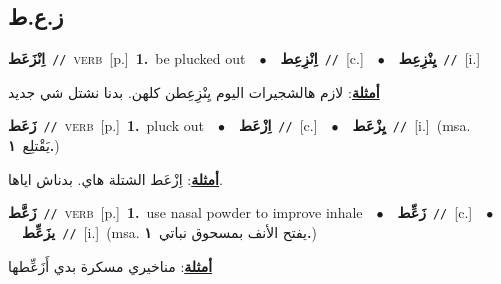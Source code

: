 \documentclass[10pt,a4paper,twoside]{article} %
\begin{document}
\begin{multicols}{2}
\vspace{-3mm}
\subsection*{\color{blue}\foreignlanguage{arabic}{ز.ع.ط}\color{blue}{}} 

{\setlength\topsep{0pt}\textbf{\foreignlanguage{arabic}{اِنْزَعَط}}\ {\color{gray}\texttt{//}\color{black}}\ \textsc{verb}\ [p.]\ \textbf{1.}~be plucked out\ \ $\bullet$\ \ \setlength\topsep{0pt}\textbf{\foreignlanguage{arabic}{اِنْزِعِط}}\ {\color{gray}\texttt{//}\color{black}}\ [c.]\ \ $\bullet$\ \ \setlength\topsep{0pt}\textbf{\foreignlanguage{arabic}{يِنْزِعِط}}\ {\color{gray}\texttt{//}\color{black}}\ [i.]\  \begin{flushright}\color{gray}\foreignlanguage{arabic}{\textbf{\underline{\foreignlanguage{arabic}{أمثلة}}}: لازم هالشجيرات اليوم يِنْزِعِطن كلهن. بدنا نشتل شي جديد}\end{flushright}\color{black}} \vspace{2mm}

{\setlength\topsep{0pt}\textbf{\foreignlanguage{arabic}{زَعَط}}\ {\color{gray}\texttt{//}\color{black}}\ \textsc{verb}\ [p.]\ \textbf{1.}~pluck out\ \ $\bullet$\ \ \setlength\topsep{0pt}\textbf{\foreignlanguage{arabic}{اِزْعَط}}\ {\color{gray}\texttt{//}\color{black}}\ [c.]\ \ $\bullet$\ \ \setlength\topsep{0pt}\textbf{\foreignlanguage{arabic}{يِزْعَط}}\ {\color{gray}\texttt{//}\color{black}}\ [i.]\ \color{gray}(msa. \foreignlanguage{arabic}{يَقْتلِع}~\foreignlanguage{arabic}{\textbf{١.}})\color{black}\  \begin{flushright}\color{gray}\foreignlanguage{arabic}{\textbf{\underline{\foreignlanguage{arabic}{أمثلة}}}: اِزْعَط الشتلة هاي. بدناش اياها.}\end{flushright}\color{black}} \vspace{2mm}

{\setlength\topsep{0pt}\textbf{\foreignlanguage{arabic}{زَعَّط}}\ {\color{gray}\texttt{//}\color{black}}\ \textsc{verb}\ [p.]\ \textbf{1.}~use nasal powder to improve inhale\ \ $\bullet$\ \ \setlength\topsep{0pt}\textbf{\foreignlanguage{arabic}{زَعِّط}}\ {\color{gray}\texttt{//}\color{black}}\ [c.]\ \ $\bullet$\ \ \setlength\topsep{0pt}\textbf{\foreignlanguage{arabic}{يزَعِّط}}\ {\color{gray}\texttt{//}\color{black}}\ [i.]\ \color{gray}(msa. \foreignlanguage{arabic}{يفتح الأنف بمسحوق نباتي}~\foreignlanguage{arabic}{\textbf{١.}})\color{black}\  \begin{flushright}\color{gray}\foreignlanguage{arabic}{\textbf{\underline{\foreignlanguage{arabic}{أمثلة}}}: مناخيري مسكرة بدي أَزَعِّطها}\end{flushright}\color{black}} \vspace{2mm}


\end{multicols}
\end{document}
